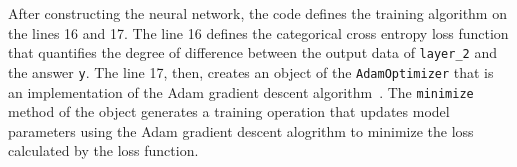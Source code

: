 
After constructing the neural network, the code defines the training algorithm
on the lines 16 and 17.
The line 16 defines the categorical cross entropy loss function that
quantifies the degree of difference between the output data of {\tt layer\_2}
and the answer {\tt y}.
The line 17, then, creates an object of the {\tt AdamOptimizer} that is an
implementation of the Adam gradient descent algorithm~\cite{kingma2014adam}.
The {\tt minimize} method of the object generates a training operation that
updates model parameters using the Adam gradient descent alogrithm to minimize
the loss calculated by the loss function.


